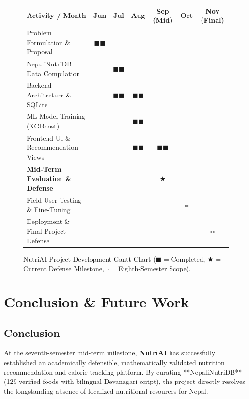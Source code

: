 \documentclass[12pt,a4paper]{report}
\begin{document}
\begin{figure}[htbp]
\centering
\small
\begin{tabular}{p{4.2cm}|c|c|c|c|c|c}
\toprule
\textbf{Activity / Month} & \textbf{Jun} & \textbf{Jul} & \textbf{Aug} & \textbf{Sep (Mid)} & \textbf{Oct} & \textbf{Nov (Final)} \\
\midrule
Problem Formulation \& Proposal & $\blacksquare\blacksquare$ & & & & & \\
NepaliNutriDB Data Compilation & & $\blacksquare\blacksquare$ & & & & \\
Backend Architecture \& SQLite & & $\blacksquare\blacksquare$ & $\blacksquare\blacksquare$ & & & \\
ML Model Training (XGBoost) & & & $\blacksquare\blacksquare$ & & & \\
Frontend UI \& Recommendation Views & & & $\blacksquare\blacksquare$ & $\blacksquare\blacksquare$ & & \\
\textbf{Mid-Term Evaluation \& Defense} & & & & $\bigstar$ & & \\
Field User Testing \& Fine-Tuning & & & & & $\square\square$ & \\
Deployment \& Final Project Defense & & & & & & $\square\square$ \\
\bottomrule
\end{tabular}
\caption{NutriAI Project Development Gantt Chart ($\blacksquare$ = Completed, $\bigstar$ = Current Defense Milestone, $\square$ = Eighth-Semester Scope).}
\label{fig:gantt}
\end{figure}

\chapter{Conclusion \& Future Work}

\section{Conclusion}

At the seventh-semester mid-term milestone, \textbf{NutriAI} has successfully established an academically defensible, mathematically validated nutrition recommendation and calorie tracking platform. By curating **NepaliNutriDB** (129 verified foods with bilingual Devanagari script), the project directly resolves the longstanding absence of localized nutritional resources for Nepal.
\end{document}
